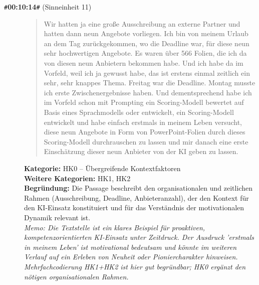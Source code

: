 \begin{description}
  \item[\texttt{\#}\textbf{00:10:14}\texttt{\#} (Sinneinheit 11)]
  \begin{quote}
  Wir hatten ja eine große Ausschreibung an externe Partner und hatten dann neun Angebote vorliegen. Ich bin von meinem Urlaub an dem Tag zurückgekommen, wo die Deadline war, für diese neun sehr hochwertigen Angebote. Es waren über 566 Folien, die ich da von diesen neun Anbietern bekommen habe. Und ich habe da im Vorfeld, weil ich ja gewusst habe, das ist erstens einmal zeitlich ein sehr, sehr knappes Thema. Freitag war die Deadline. Montag musste ich erste Zwischenergebnisse haben. Und dementsprechend habe ich im Vorfeld schon mit Prompting ein Scoring-Modell bewertet auf Basis eines Sprachmodells oder entwickelt, ein Scoring-Modell entwickelt und habe einfach erstmals in meinem Leben versucht, diese neun Angebote in Form von PowerPoint-Folien durch dieses Scoring-Modell durchrauschen zu lassen und mir danach eine erste Einschätzung dieser neun Anbieter von der KI geben zu lassen.
  \end{quote}
  \textbf{Kategorie:} HK0 -- Übergreifende Kontextfaktoren\\
  \textbf{Weitere Kategorien:} HK1, HK2\\
  \textbf{Begr\"undung:} Die Passage beschreibt den organisationalen und zeitlichen Rahmen (Ausschreibung, Deadline, Anbieteranzahl), der den Kontext für den KI-Einsatz konstituiert und für das Verständnis der motivationalen Dynamik relevant ist.
  \\\textit{Memo: Die Textstelle ist ein klares Beispiel für proaktiven, kompetenzorientierten KI-Einsatz unter Zeitdruck. Der Ausdruck 'erstmals in meinem Leben' ist motivational bedeutsam und könnte im weiteren Verlauf auf ein Erleben von Neuheit oder Pioniercharakter hinweisen. Mehrfachcodierung HK1+HK2 ist hier gut begründbar; HK0 ergänzt den nötigen organisationalen Rahmen.}
\end{description}
\medskip

